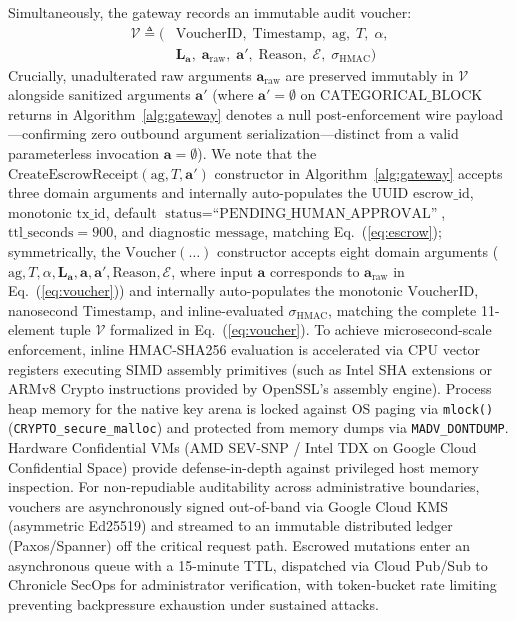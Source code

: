 \documentclass[conference,10pt]{IEEEtran}
\begin{document}
Simultaneously, the gateway records an immutable audit voucher:
\begin{equation}
\label{eq:voucher}
\begin{split}
\mathcal{V} \triangleq \big( &\text{VoucherID}, \; \text{Timestamp}, \; \text{ag}, \; T, \; \alpha, \\
&\mathbf{L}_{\mathbf{a}}, \; \mathbf{a}_{\text{raw}}, \; \mathbf{a}', \; \text{Reason}, \; \mathcal{E}, \; \sigma_{\text{HMAC}} \big)
\end{split}
\end{equation}
Crucially, unadulterated raw arguments $\mathbf{a}_{\text{raw}}$ are preserved immutably in $\mathcal{V}$ alongside sanitized arguments $\mathbf{a}'$ (where $\mathbf{a}' = \emptyset$ on $\text{CATEGORICAL\_BLOCK}$ returns in Algorithm~\ref{alg:gateway} denotes a null post-enforcement wire payload---confirming zero outbound argument serialization---distinct from a valid parameterless invocation $\mathbf{a} = \emptyset$). We note that the $\text{CreateEscrowReceipt}(\text{ag}, T, \mathbf{a}')$ constructor in Algorithm~\ref{alg:gateway} accepts three domain arguments and internally auto-populates the UUID $\text{escrow\_id}$, monotonic $\text{tx\_id}$, default $\text{status} = \text{``PENDING\_HUMAN\_APPROVAL''}$, $\text{ttl\_seconds} = 900$, and diagnostic $\text{message}$, matching Eq.~(\ref{eq:escrow}); symmetrically, the $\text{Voucher}(\dots)$ constructor accepts eight domain arguments ($\text{ag}, T, \alpha, \mathbf{L}_{\mathbf{a}}, \mathbf{a}, \mathbf{a}', \text{Reason}, \mathcal{E}$, where input $\mathbf{a}$ corresponds to $\mathbf{a}_{\text{raw}}$ in Eq.~(\ref{eq:voucher})) and internally auto-populates the monotonic $\text{VoucherID}$, nanosecond $\text{Timestamp}$, and inline-evaluated $\sigma_{\text{HMAC}}$, matching the complete 11-element tuple $\mathcal{V}$ formalized in Eq.~(\ref{eq:voucher}). To achieve microsecond-scale enforcement, inline HMAC-SHA256 evaluation is accelerated via CPU vector registers executing SIMD assembly primitives (such as Intel SHA extensions or ARMv8 Crypto instructions provided by OpenSSL's assembly engine). Process heap memory for the native key arena is locked against OS paging via \texttt{mlock()} (\texttt{CRYPTO\_secure\_malloc}) and protected from memory dumps via \texttt{MADV\_DONTDUMP}. Hardware Confidential VMs (AMD SEV-SNP / Intel TDX on Google Cloud Confidential Space) provide defense-in-depth against privileged host memory inspection. For non-repudiable auditability across administrative boundaries, vouchers are asynchronously signed out-of-band via Google Cloud KMS (asymmetric Ed25519) and streamed to an immutable distributed ledger (Paxos/Spanner) off the critical request path. Escrowed mutations enter an asynchronous queue with a 15-minute TTL, dispatched via Cloud Pub/Sub to Chronicle SecOps for administrator verification, with token-bucket rate limiting preventing backpressure exhaustion under sustained attacks.
\end{document}
